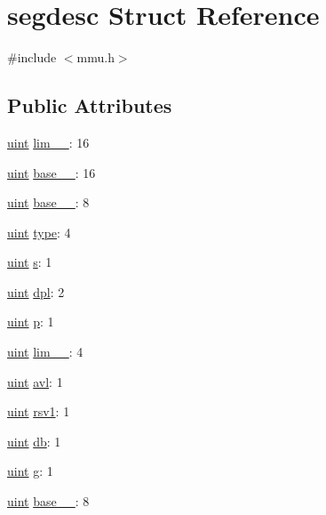 \hypertarget{structsegdesc}{}\section{segdesc Struct Reference}
\label{structsegdesc}


{\ttfamily \#include $<$mmu.\+h$>$}

\subsection*{Public Attributes}
\begin{DoxyCompactItemize}
\item 
\hyperlink{types_8h_a91ad9478d81a7aaf2593e8d9c3d06a14}{uint} \hyperlink{structsegdesc_a021002a4cf151893b5b8034b09cc7530}{lim\+\_\+\_}\+: 16
\item 
\hyperlink{types_8h_a91ad9478d81a7aaf2593e8d9c3d06a14}{uint} \hyperlink{structsegdesc_aaf95dd5b9105cf5729de49eb2542072a}{base\+\_\+\_}\+: 16
\item 
\hyperlink{types_8h_a91ad9478d81a7aaf2593e8d9c3d06a14}{uint} \hyperlink{structsegdesc_aa5cff1f1ddfac386e2268108c8f5b6c2}{base\+\_\+\_}\+: 8
\item 
\hyperlink{types_8h_a91ad9478d81a7aaf2593e8d9c3d06a14}{uint} \hyperlink{structsegdesc_acb54ea5ee6d09cfcc8b4dd3e96e4ce5b}{type}\+: 4
\item 
\hyperlink{types_8h_a91ad9478d81a7aaf2593e8d9c3d06a14}{uint} \hyperlink{structsegdesc_aacc67bb0857f0c77c1f8a5c9b8a1ac09}{s}\+: 1
\item 
\hyperlink{types_8h_a91ad9478d81a7aaf2593e8d9c3d06a14}{uint} \hyperlink{structsegdesc_ab22349cefd6990e4a9a1d93e42ee0c03}{dpl}\+: 2
\item 
\hyperlink{types_8h_a91ad9478d81a7aaf2593e8d9c3d06a14}{uint} \hyperlink{structsegdesc_a322a34a84a3815d35ebb3aa50c5a55e2}{p}\+: 1
\item 
\hyperlink{types_8h_a91ad9478d81a7aaf2593e8d9c3d06a14}{uint} \hyperlink{structsegdesc_abbc27a39a2ad6e59faa2eca33d7dfa0c}{lim\+\_\+\_}\+: 4
\item 
\hyperlink{types_8h_a91ad9478d81a7aaf2593e8d9c3d06a14}{uint} \hyperlink{structsegdesc_a6623d25de54a0a87d7a43ea4dfe7783f}{avl}\+: 1
\item 
\hyperlink{types_8h_a91ad9478d81a7aaf2593e8d9c3d06a14}{uint} \hyperlink{structsegdesc_a5798904f15e8fb63d2dd37e8a2818f0a}{rsv1}\+: 1
\item 
\hyperlink{types_8h_a91ad9478d81a7aaf2593e8d9c3d06a14}{uint} \hyperlink{structsegdesc_a08edbd480d21bfd147e304b6f5a3788f}{db}\+: 1
\item 
\hyperlink{types_8h_a91ad9478d81a7aaf2593e8d9c3d06a14}{uint} \hyperlink{structsegdesc_a6af7593606fa1a1ff003b4a78facc8e0}{g}\+: 1
\item 
\hyperlink{types_8h_a91ad9478d81a7aaf2593e8d9c3d06a14}{uint} \hyperlink{structsegdesc_a164a6a2e75fc62e61daef3ddab7f3169}{base\+\_\+\_}\+: 8
\end{DoxyCompactItemize}


